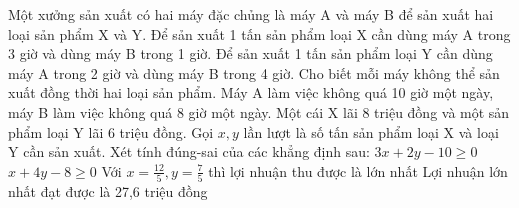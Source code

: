 \begin{ex}
 Một xưởng sản xuất có hai máy đặc chủng là máy A và máy B để sản xuất hai loại sản phẩm X và Y. Để sản xuất 1 tấn sản phẩm loại X cần dùng máy A trong 3 giờ và dùng máy B trong 1 giờ. Để sản xuất 1 tấn sản phẩm loại Y cần dùng máy A trong 2 giờ và dùng máy B trong 4 giờ. Cho biết mỗi máy không thể sản xuất đồng thời hai loại sản phẩm. Máy A làm việc không quá 10 giờ một ngày, máy B làm việc không quá 8 giờ một ngày. Một cái X lãi 8 triệu đồng và một sản phẩm loại Y lãi 6 triệu đồng. Gọi ${x,y}$ lần lượt là số tấn sản phẩm loại X và loại Y cần sản xuất. Xét tính đúng-sai của các khẳng định sau:
\choiceTFt
{ $3 x + 2 y - 10 \ge 0$ }
   { $x + 4 y - 8 \ge 0$ }
     { \True  Với $x = \frac{12}{5}, y = \frac{7}{5}$ thì lợi nhuận thu được là lớn nhất }
    { \True  Lợi nhuận lớn nhất đạt được là 27,6 triệu đồng }
\end{ex}

